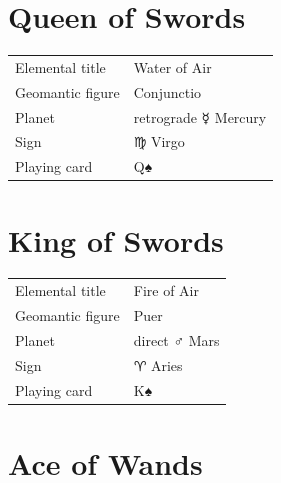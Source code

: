\newpage
\section*{Queen of Swords}

\begin{center}
\end{center}

\vspace{4mm}
\noindent\begin{tabular}{@{}l@{\quad}l@{}}
Elemental title & Water of Air \\
Geomantic figure & Conjunctio \\
Planet & retrograde {\symbfont ☿} Mercury \\
Sign & {\symbfont ♍} Virgo \\
Playing card & Q♠ \\
\end{tabular}

\newpage
\section*{King of Swords}

\begin{center}
\end{center}

\vspace{4mm}
\noindent\begin{tabular}{@{}l@{\quad}l@{}}
Elemental title & Fire of Air \\
Geomantic figure & Puer \\
Planet & direct {\symbfont ♂} Mars \\
Sign & {\symbfont ♈} Aries \\
Playing card & K♠ \\
\end{tabular}


\newpage
\section*{Ace of Wands}

\begin{center}
\resizebox{!}{60mm}{\cardWone}
\end{center}

